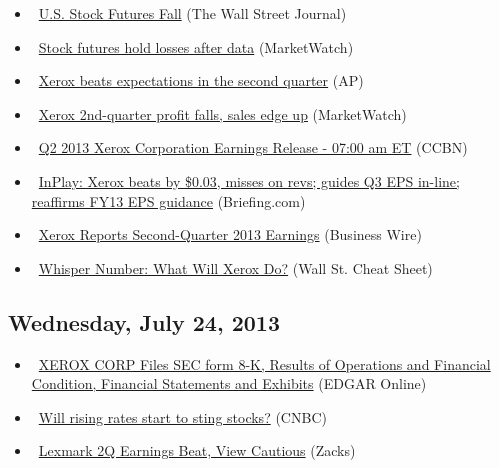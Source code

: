\documentclass[11pt,asymmetric]{article}
\begin{document}
\begin{itemize}
\item\ \href{http://online.wsj.com/article/SB10001424127887323610704578627370847715166.html?ru=yahoo&mod=yahoo_hs}{U.S. Stock Futures Fall} (The Wall Street Journal)
\item\ \href{http://www.marketwatch.com/News/Story/Story.aspx?guid=DF69A36E-F507-11E2-9F9D-002128040CF6&siteid=yhoof2}{Stock futures hold losses after data} (MarketWatch)
\item\ \href{http://finance.yahoo.com/news/xerox-beats-expectations-second-quarter-120258776.html}{Xerox beats expectations in the second quarter} (AP)
\item\ \href{http://www.marketwatch.com/News/Story/Story.aspx?guid=AA255D73-F342-4D50-96E0-8FD52AC37631&siteid=yhoof2}{Xerox 2nd-quarter profit falls, sales edge up} (MarketWatch)
\item\ \href{http://biz.yahoo.com/research/earncal/20130725.html?t=xrx}{Q2 2013 Xerox Corporation Earnings Release - 07:00 am ET} (CCBN)
\item\ \href{http://finance.yahoo.com/mp#xrx}{InPlay: Xerox beats by \$0.03, misses on revs; guides Q3 EPS in-line; reaffirms FY13 EPS guidance} (Briefing.com)
\item\ \href{http://finance.yahoo.com/news/xerox-reports-second-quarter-2013-110000730.html}{Xerox Reports Second-Quarter 2013 Earnings} (Business Wire)
\item\ \href{http://wallstcheatsheet.com/stocks/whisper-number-what-will-xerox-do.html/?ref=YF}{Whisper Number: What Will Xerox Do?} (Wall St. Cheat Sheet)
\end{itemize}
\subsection*{Wednesday, July 24, 2013}
\begin{itemize}
\item\ \href{http://biz.yahoo.com/e/130725/xrx8-k.html}{XEROX CORP Files SEC form 8-K, Results of Operations and Financial Condition, Financial Statements and Exhibits} (EDGAR Online)
\item\ \href{http://www.cnbc.com/id/100911583?__source=yahoo%7Cfinance%7Cheadline%7Cheadline%7Cstory&par=yahoo&doc=100911583%7CWill+rising+rates+start+t}{Will rising rates start to sting stocks?} (CNBC)
\item\ \href{http://finance.yahoo.com/news/lexmark-2q-earnings-beat-view-190005258.html}{Lexmark 2Q Earnings Beat, View Cautious} (Zacks)
\end{itemize}
\end{document}
